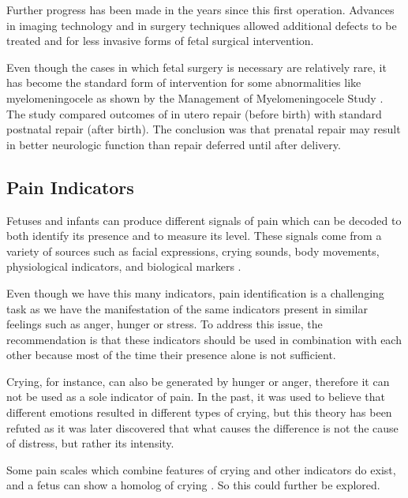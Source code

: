 Further progress has been made in the years since this first operation. Advances in imaging technology and in surgery techniques allowed additional defects to be treated and for less invasive forms of fetal surgical intervention.

Even though the cases in which fetal surgery is necessary are relatively rare, it has become the standard form of intervention for some abnormalities like myelomeningocele as shown by the Manage­ment of Myelomeningocele Study \citep{Adzick2011}. The study compared outcomes of in utero repair (before birth) with standard postnatal repair (after birth). The conclusion was that prenatal repair may result in better neurologic function than repair deferred until after delivery.






\subsection{Pain Indicators}

Fetuses and infants can produce different signals of pain which can be decoded to both identify its presence and to measure its level. These signals come from a variety of sources such as facial expressions, crying sounds, body movements, physiological indicators, and biological markers \citep{Bellieni2012}. 

Even though we have this many indicators, pain identification is a challenging task as we have the manifestation of the same indicators present in similar feelings such as anger, hunger or stress. To address this issue, the recommendation is that these indicators should be used in combination with each other because most of the time their presence alone is not sufficient. 

Crying, for instance, can also be generated by hunger or anger, therefore it can not be used as a sole indicator of pain. In the past, it was used to believe that different emotions resulted in different types of crying, but this theory has been refuted as it was later discovered that what causes the difference is not the cause of distress, but rather its intensity. 

Some pain scales which combine features of crying and other indicators do exist, and a fetus can show a homolog of crying \citep{Gingras2005}. So this could further be explored. \cite{abs-1909-02543}


